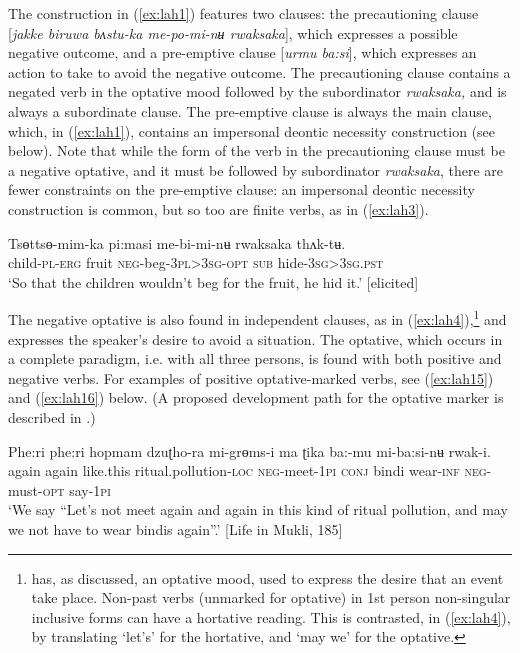 \documentclass[output=paper,colorlinks,citecolor=brown]{langscibook}
\begin{document}
The construction in (\ref{ex:lah1}) features two clauses: the precautioning clause [\textit{jakke biruwa bʌstu-ka me-po-mi-nʉ rwaksaka}], which expresses a possible negative outcome, and a pre-emptive clause [\textit{urmu ba:si}], which expresses an action to take to avoid the negative outcome. The precautioning clause contains a negated verb in the optative mood followed by the subordinator \textit{rwaksaka,} and is always a subordinate clause. The pre-emptive clause is always the main clause, which, in (\ref{ex:lah1}), contains an impersonal deontic necessity construction (see  below). Note that while the form of the verb in the precautioning clause must be a negative optative, and it must be followed by subordinator \textit{rwaksaka}, there are fewer constraints on the pre-emptive clause: an impersonal deontic necessity construction is common, but so too are finite verbs, as in (\ref{ex:lah3}). 

\ea \label{ex:lah3}
\gll Tsɵttsɵ-mim-ka pi:masi me-bi-mi-nʉ rwaksaka thʌk-tʉ. \\
child-\textsc{pl-erg} fruit \textsc{neg}-beg-\textsc{3pl>3sg-opt} \textsc{sub} hide-\textsc{3sg>3sg.pst} \\
\glt `So that the children wouldn't beg for the fruit, he hid it.' [elicited]
\z

The negative optative is also found in independent clauses, as in (\ref{ex:lah4}),\footnote{ has, as discussed, an optative mood, used to express the desire that an event take place. Non-past verbs (unmarked for optative) in 1st person non-singular inclusive forms can have a hortative reading. This is contrasted, in (\ref{ex:lah4}), by translating `let's' for the hortative, and `may we' for the optative.} and expresses the speaker's desire to avoid a situation. The optative, which occurs in a complete paradigm, i.e. with all three persons, is found with both positive and negative verbs. For examples of positive optative-marked verbs, see 
(\ref{ex:lah15}) and (\ref{ex:lah16}) below. (A proposed development path for the optative marker is described in .)


\ea
\label{ex:lah4}
\gll Phe:ri phe:ri hopmam dzuʈho{}-ra mi{}-grɵms-i ma ʈika ba:-mu mi-ba:si-nʉ  rwak-i. \\
again again like.this ritual.pollution\textsc{-loc}  \textsc{neg}-meet-\textsc{1pi} \textsc{conj} bindi wear-\textsc{inf} \textsc{neg}-must-\textsc{opt} say-\textsc{1pi} \\
\glt `We say ``Let's not meet again and again in this kind of ritual pollution, and may we not have to wear bindis again''.' [Life in Mukli, 185]
\z
\end{document}
